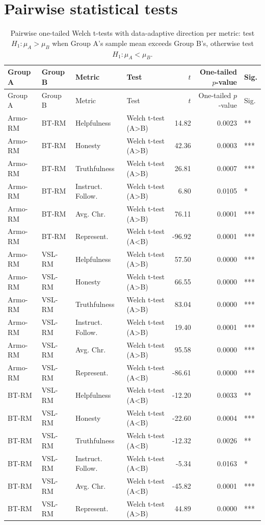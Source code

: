 \documentclass{article}
\begin{document}
\section*{Pairwise statistical tests}

\begin{longtable}{llllrrl}
\caption{Pairwise one-tailed Welch t-tests with data-adaptive direction per metric: test $H_1: \mu_{A} > \mu_{B}$ when Group A's sample mean exceeds Group B's, otherwise test $H_1: \mu_{A} < \mu_{B}$.}\label{tab:pairwise-tests}\\
\toprule
Group A & Group B & Metric & Test & $t$ & One-tailed $p$-value & Sig. \\
\midrule
\endfirsthead
\toprule
Group A & Group B & Metric & Test & $t$ & One-tailed $p$-value & Sig. \\
\midrule
\endhead
\bottomrule
\endfoot
Armo-RM & BT-RM & Helpfulness & Welch t-test (A>B) & 14.82 & 0.0023 & ** \\
Armo-RM & BT-RM & Honesty & Welch t-test (A>B) & 42.36 & 0.0003 & *** \\
Armo-RM & BT-RM & Truthfulness & Welch t-test (A>B) & 26.81 & 0.0007 & *** \\
Armo-RM & BT-RM & Instruct. Follow. & Welch t-test (A>B) & 6.80 & 0.0105 & * \\
Armo-RM & BT-RM & Avg. Chr. & Welch t-test (A>B) & 76.11 & 0.0001 & *** \\
Armo-RM & BT-RM & Represent. & Welch t-test (A<B) & -96.92 & 0.0001 & *** \\
Armo-RM & VSL-RM & Helpfulness & Welch t-test (A>B) & 57.50 & 0.0000 & *** \\
Armo-RM & VSL-RM & Honesty & Welch t-test (A>B) & 66.55 & 0.0000 & *** \\
Armo-RM & VSL-RM & Truthfulness & Welch t-test (A>B) & 83.04 & 0.0000 & *** \\
Armo-RM & VSL-RM & Instruct. Follow. & Welch t-test (A>B) & 19.40 & 0.0001 & *** \\
Armo-RM & VSL-RM & Avg. Chr. & Welch t-test (A>B) & 95.58 & 0.0000 & *** \\
Armo-RM & VSL-RM & Represent. & Welch t-test (A<B) & -86.61 & 0.0000 & *** \\
BT-RM & VSL-RM & Helpfulness & Welch t-test (A<B) & -12.20 & 0.0033 & ** \\
BT-RM & VSL-RM & Honesty & Welch t-test (A<B) & -22.60 & 0.0004 & *** \\
BT-RM & VSL-RM & Truthfulness & Welch t-test (A<B) & -12.32 & 0.0026 & ** \\
BT-RM & VSL-RM & Instruct. Follow. & Welch t-test (A<B) & -5.34 & 0.0163 & * \\
BT-RM & VSL-RM & Avg. Chr. & Welch t-test (A<B) & -45.82 & 0.0001 & *** \\
BT-RM & VSL-RM & Represent. & Welch t-test (A>B) & 44.89 & 0.0000 & *** \\
\end{longtable}
\end{document}
